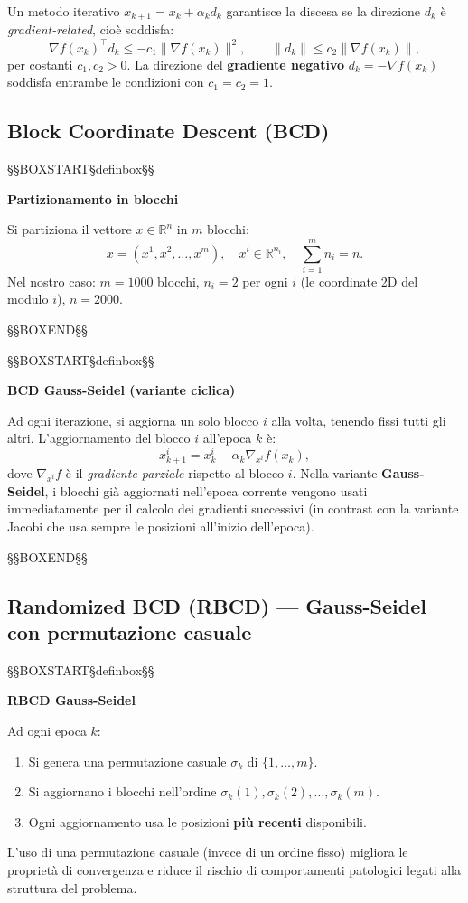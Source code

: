 \documentclass[12pt,a4paper]{article}
\theoremstyle{definition}
\newcommand{\R}{\mathbb{R}}
\newcommand{\grad}{\nabla}
\newcommand{\T}{^{\top}}
\begin{document}
Un metodo iterativo $x_{k+1} = x_k + \alpha_k d_k$ garantisce la discesa se la direzione
$d_k$ è \emph{gradient-related}, cioè soddisfa:
\[
  \grad f(x_k)\T d_k \leq -c_1 \|\grad f(x_k)\|^2, \qquad
  \|d_k\| \leq c_2 \|\grad f(x_k)\|,
\]
per costanti $c_1, c_2 > 0$.
La direzione del \textbf{gradiente negativo} $d_k = -\grad f(x_k)$ soddisfa entrambe
le condizioni con $c_1 = c_2 = 1$.

\subsection{Block Coordinate Descent (BCD)}



\noindent §§BOXSTART§definbox§§

\textbf{Partizionamento in blocchi}


Si partiziona il vettore $x \in \R^n$ in $m$ blocchi:
\[
  x = (x^1, x^2, \ldots, x^m), \quad x^i \in \R^{n_i}, \quad \sum_{i=1}^m n_i = n.
\]
Nel nostro caso: $m = 1000$ blocchi, $n_i = 2$ per ogni $i$ (le coordinate 2D del modulo $i$),
$n = 2000$.


\noindent §§BOXEND§§





\noindent §§BOXSTART§definbox§§

\textbf{BCD Gauss-Seidel (variante ciclica)}


Ad ogni iterazione, si aggiorna un solo blocco $i$ alla volta, tenendo fissi tutti gli altri.
L'aggiornamento del blocco $i$ all'epoca $k$ è:
\[
  x^i_{k+1} = x^i_k - \alpha_k \grad_{x^i} f(x_k),
\]
dove $\grad_{x^i} f$ è il \emph{gradiente parziale} rispetto al blocco $i$.
Nella variante \textbf{Gauss-Seidel}, i blocchi già aggiornati nell'epoca corrente vengono
usati immediatamente per il calcolo dei gradienti successivi (in contrast con la variante
Jacobi che usa sempre le posizioni all'inizio dell'epoca).


\noindent §§BOXEND§§



\subsection{Randomized BCD (RBCD) — Gauss-Seidel con permutazione casuale}



\noindent §§BOXSTART§definbox§§

\textbf{RBCD Gauss-Seidel}


Ad ogni epoca $k$:
\begin{enumerate}
  \item Si genera una permutazione casuale $\sigma_k$ di $\{1, \ldots, m\}$.
  \item Si aggiornano i blocchi nell'ordine $\sigma_k(1), \sigma_k(2), \ldots, \sigma_k(m)$.
  \item Ogni aggiornamento usa le posizioni \textbf{più recenti} disponibili.
\end{enumerate}
L'uso di una permutazione casuale (invece di un ordine fisso) migliora le proprietà di
convergenza e riduce il rischio di comportamenti patologici legati alla struttura del problema.
\end{document}
